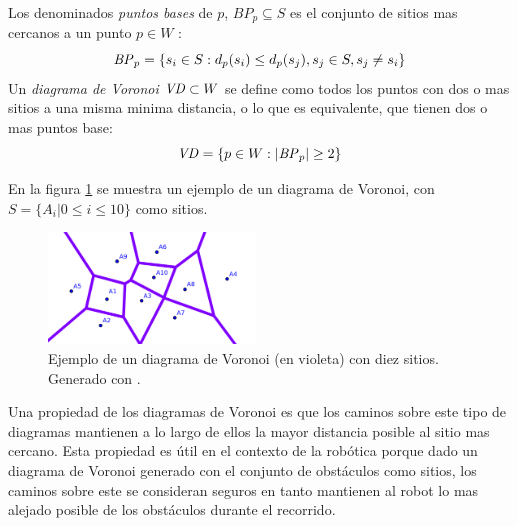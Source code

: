 Los denominados \emph{puntos bases} de $p$, $BP_p \subseteq S$ es el conjunto de sitios mas cercanos a un punto $p \in W$ :
\begin{equation}
  \mathit{BP}_p =\{s_i \in S: d_p(s_i) \leq d_p(s_j), s_j\in S,s_j \neq s_i\}\label{eq:bases}
\end{equation}
Un \emph{diagrama de Voronoi} $\mathit{VD}\subset W$ se define como todos los puntos con dos o mas sitios a una misma minima distancia, o lo que es equivalente, que tienen dos o mas puntos base: 
\begin{equation}
  \mathit{VD} = \{p \in W : |\mathit{BP}_p| \geq 2\}\label{eq:DV}
\end{equation}


En la figura \ref{fig:ejemploVoronoi} se muestra un ejemplo de un diagrama de Voronoi, con $S=\{A_i | 0\leq i \leq 10\}$ como sitios.
\begin{figure}[H]
  \center
  \includegraphics[width=5.5cm]{imagenes/VD.png}
  \caption{Ejemplo de un diagrama de Voronoi (en violeta) con diez sitios. Generado con \cite{voronoigeo}.}\label{fig:ejemploVoronoi}
\end{figure} 

Una propiedad de los diagramas de Voronoi es que los caminos sobre este tipo de diagramas mantienen a lo largo de ellos la mayor distancia posible al sitio mas cercano.
Esta propiedad es útil en el contexto de la robótica porque dado un diagrama de Voronoi generado con el conjunto de obstáculos como sitios, los caminos sobre este se consideran seguros en tanto mantienen al robot lo mas alejado posible de los obstáculos durante el recorrido.

